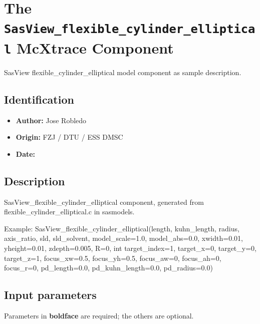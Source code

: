 \section{The \texttt{SasView\_flexible\_cylinder\_elliptical} McXtrace Component}
SasView flexible\_cylinder\_elliptical model component as sample description.

\subsection*{Identification}
\begin{itemize}
  \item \textbf{Author:} Jose Robledo
  \item \textbf{Origin:} FZJ / DTU / ESS DMSC
  \item \textbf{Date:} 
\end{itemize}

\subsection*{Description}
SasView\_flexible\_cylinder\_elliptical component, generated from flexible\_cylinder\_elliptical.c in sasmodels.

Example: SasView\_flexible\_cylinder\_elliptical(length, kuhn\_length, radius, axis\_ratio, sld, sld\_solvent, model\_scale=1.0, model\_abs=0.0, xwidth=0.01, yheight=0.01, zdepth=0.005, R=0, int target\_index=1, target\_x=0, target\_y=0, target\_z=1, focus\_xw=0.5, focus\_yh=0.5, focus\_aw=0, focus\_ah=0, focus\_r=0, pd\_length=0.0, pd\_kuhn\_length=0.0, pd\_radius=0.0)

\subsection*{Input parameters}
Parameters in \textbf{boldface} are required; the others are optional.

